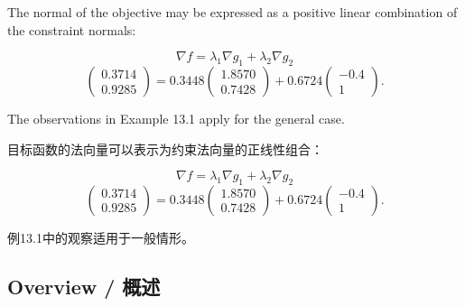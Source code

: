 \begin{original}
The normal of the objective may be expressed as a positive linear combination of the constraint normals:

\[
\nabla f = \lambda_1 \nabla g_1 + \lambda_2 \nabla g_2
\]
\[
\begin{pmatrix} 0.3714 \\ 0.9285 \end{pmatrix} = 0.3448 \begin{pmatrix} 1.8570 \\ 0.7428 \end{pmatrix} + 0.6724 \begin{pmatrix} -0.4 \\ 1 \end{pmatrix}. \tag{13.1}
\]

The observations in Example 13.1 apply for the general case.
\end{original}
\begin{translation}
目标函数的法向量可以表示为约束法向量的正线性组合：

\[
\nabla f = \lambda_1 \nabla g_1 + \lambda_2 \nabla g_2
\]
\[
\begin{pmatrix} 0.3714 \\ 0.9285 \end{pmatrix} = 0.3448 \begin{pmatrix} 1.8570 \\ 0.7428 \end{pmatrix} + 0.6724 \begin{pmatrix} -0.4 \\ 1 \end{pmatrix}. \tag{13.1}
\]

例13.1中的观察适用于一般情形。
\end{translation}

\subsection{Overview / 概述}

